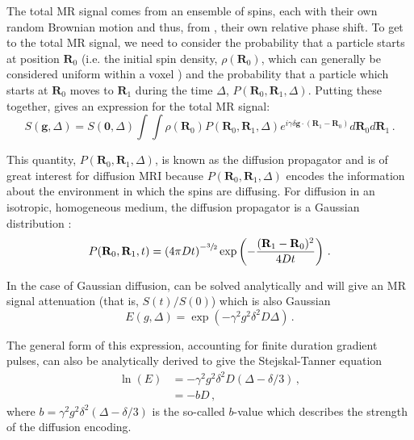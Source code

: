The total MR signal comes from an ensemble of spins, each with their own random Brownian motion and thus, from , their own relative phase shift.
To get to the total MR signal, we need to consider the probability that a particle starts at position $\mathbf{R}_0$ (i.e. the initial spin density, $\rho(\mathbf{R}_0)$, which can generally be considered uniform within a voxel \cite{Price1997}) and the probability that a particle which starts at $\mathbf{R}_0$ moves to $\mathbf{R}_1$ during the time $\Delta$, $P(\mathbf{R}_0, \mathbf{R}_1, \Delta)$.
Putting these together, gives an expression for the total MR signal\cite{Price1997,Stejskal1965}:
\begin{equation}
  S(\mathbf{g}, \Delta) = S(\mathbf{0}, \Delta)\int\int \rho(\mathbf{R}_0)P(\mathbf{R}_0, \mathbf{R}_1, \Delta) e^{i\gamma\delta\mathbf{g} \cdot (\mathbf{R}_1 - \mathbf{R}_0)}  d\mathbf{R}_0d\mathbf{R}_1\,.
  \label{eq:total_signal_sgp}
\end{equation}

This quantity, $P(\mathbf{R}_0, \mathbf{R}_1, \Delta)$, is known as the diffusion propagator and is of great interest for diffusion MRI because $P(\mathbf{R}_0, \mathbf{R}_1, \Delta)$ encodes the information about the environment in which the spins are diffusing. 
For diffusion in an isotropic, homogeneous medium, the diffusion propagator is a Gaussian distribution \cite{Price1997}:
\begin{equation}
  P(\mathbf{R}_0, \mathbf{R}_1, t) = \left(4\pi Dt\right)^{-\sfrac{3}{2}}\exp\left(-\frac{(\mathbf{R}_1 - \mathbf{R}_0)^2}{4Dt}\right)\,.
  \label{eq:propagator_diffusion}
\end{equation}

In the case of Gaussian diffusion,  can be solved analytically and will give an MR signal attenuation (that is, $S(t)/S(0)$) which is also Gaussian\cite{Stejskal1965,Price1997}
\begin{equation}
  E(g, \Delta) = \exp(-\gamma^2g^2\delta^2D\Delta)\,.
  \label{eq:sgp_signal_gaussian}
\end{equation}

The general form of this expression, accounting for finite duration gradient pulses, can also be analytically derived to give the Stejskal-Tanner equation \cite{Stejskal1965,Kuchel2012}
\begin{align}
  \ln(E) &= -\gamma^2g^2\delta^2D(\Delta - \delta/3)\,,\label{eq:stejskal_tanner}\\
  &= -bD\,,
\end{align}
where $b = \gamma^2g^2\delta^2(\Delta - \delta/3)$ is the so-called $b$-value which describes the strength of the diffusion encoding. 


